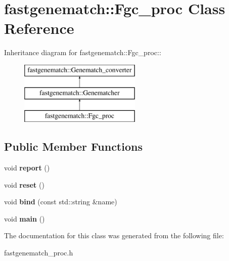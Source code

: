 \hypertarget{classfastgenematch_1_1Fgc__proc}{
\section{fastgenematch::Fgc\_\-proc Class Reference}
\label{classfastgenematch_1_1Fgc__proc}
}
Inheritance diagram for fastgenematch::Fgc\_\-proc::\begin{figure}[H]
\begin{center}
\leavevmode
\includegraphics[height=3cm]{classfastgenematch_1_1Fgc__proc}
\end{center}
\end{figure}
\subsection*{Public Member Functions}
\begin{DoxyCompactItemize}
\item 
\hypertarget{classfastgenematch_1_1Fgc__proc_aa2e4c70c18b1bbd11ae9e8874b1f613c}{
void {\bfseries report} ()}
\label{classfastgenematch_1_1Fgc__proc_aa2e4c70c18b1bbd11ae9e8874b1f613c}

\item 
\hypertarget{classfastgenematch_1_1Fgc__proc_a7eb4de0a28fe83671cd2e1355df81ec3}{
void {\bfseries reset} ()}
\label{classfastgenematch_1_1Fgc__proc_a7eb4de0a28fe83671cd2e1355df81ec3}

\item 
\hypertarget{classfastgenematch_1_1Fgc__proc_a2bf2a1ab299c9b24e62a60ec292783b2}{
void {\bfseries bind} (const std::string \&name)}
\label{classfastgenematch_1_1Fgc__proc_a2bf2a1ab299c9b24e62a60ec292783b2}

\item 
\hypertarget{classfastgenematch_1_1Fgc__proc_a76fe9f3ccc083ed767e687d131c301b6}{
void {\bfseries main} ()}
\label{classfastgenematch_1_1Fgc__proc_a76fe9f3ccc083ed767e687d131c301b6}

\end{DoxyCompactItemize}


The documentation for this class was generated from the following file:\begin{DoxyCompactItemize}
\item 
fastgenematch\_\-proc.h\end{DoxyCompactItemize}
